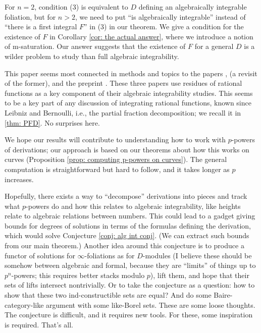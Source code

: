 \documentclass{amsart}
\theoremstyle{definition}
\begin{document}
For $n=2$, condition (3) is equivalent to $D$ defining an algebraically integrable foliation, but for $n>2$, we need to put ``is algebraically integrable'' instead of ``there is a first integral $F$'' in (3) in our theorem. We give a condition for the existence of $F$ in Corollary \ref{cor: the actual answer}, where we introduce a notion of m-saturation. Our answer suggests that the existence of $F$ for a general $D$ is a wilder problem to study than full algebraic integrability.

This paper seems most connected in methods and topics to the papers \cite{Honda_p_conjecture}, \cite{effective_p_conjecture_2026} (a revisit of the former), and the preprint  \cite{rational_first_for_separated_2025}. These three papers use residues of rational functions as a key component of their algebraic integrability studies. This seems to be a key part of any discussion of integrating rational functions, known since Leibniz and Bernoulli, i.e., the partial fraction decomposition; we recall it in \ref{thm: PFD}. No surprises here.


We hope our results will contribute to understanding how to work with $p$-powers of derivations; our approach is based on our theorems about how this works on curves (Proposition \ref{prop: computing p-powers on curves}). The general computation is straightforward but hard to follow, and it takes longer as $p$ increases. 

Hopefully, there exists a way to ``decompose'' derivations into pieces and track what $p$-powers do and how this relates to algebraic integrability, like heights relate to algebraic relations between numbers. This could lead to a gadget giving bounds for degrees of solutions in terms of the formulas defining the derivation, which would solve Conjecture \ref{conj: alg int conj}. (We can extract such bounds from our main theorem.) Another idea around this conjecture is to produce a functor of solutions for $\infty$-foliations as for $D$-modules (I believe these should be somehow between algebraic and formal, because they are ``limits'' of things up to $p^n$-powers; this requires better stacks modulo $p$), lift them, and hope that their sets of lifts intersect nontrivially. Or to take the conjecture as a question: how to show that these two ind-constructible sets are equal? And do some Baire-category-like argument with some like-Borel sets. These are some loose thoughts. The conjecture is difficult, and it requires new tools. For these, some inspiration is required. That's all.
\end{document}
